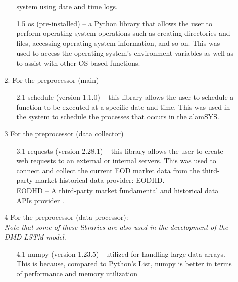 \begin{itemize}
\begin{itemize}
\begin{itemize}
                    system using date and time logs.
                    \item[1.5] os (pre-installed) – a Python library that allows 
                    the user to perform operating system operations such as creating 
                    directories and files, accessing operating system information, 
                    and so on. This was used to access the operating system's 
                    environment variables as well as to assist with other OS-based 
                    functions.
                \end{itemize}
            \item[2.] For the preprocessor (main)
                    \begin{itemize}
                        \item[2.1] schedule (version 1.1.0) – this library allows 
                        the user to schedule a function to be executed at a specific
                        date and time. This was used in the system to schedule the
                        processes that occurs in the alamSYS.
                    \end{itemize}
            \item[3] For the preprocessor (data collector)
                \begin{itemize}
                    \item[3.1] requests (version 2.28.1) – this library allows the user to create web 
                    requests to an external or internal servers. This was used to connect and collect 
                    the current EOD market data from the third-party market historical data provider: EODHD.
                    \\ EODHD – A third-party market fundamental and historical data APIs provider
                    \cite{EODHD}.
                \end{itemize}
            \item[4] For the preprocessor (data processor):
            \\ \textit{Note that some of these libraries are also used in the development of the DMD-LSTM model.}
                \begin{itemize}
                    \item[4.1] numpy (version 1.23.5) - utilized for handling large 
                    data arrays. This is because, compared to Python's 
                    List, numpy is better in terms of performance 
                    and memory utilization 

\end{itemize}
\end{itemize}
\end{itemize}
